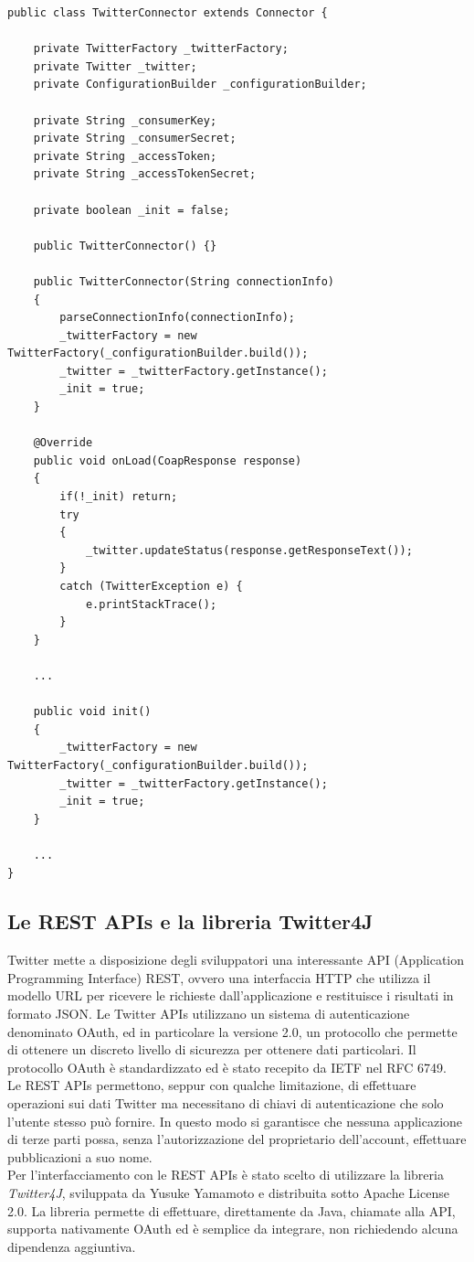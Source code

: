 \lstset{title=Parte della classe TwitterConnector}
\begin{lstlisting}[float]
public class TwitterConnector extends Connector {
	
	private TwitterFactory _twitterFactory;
	private Twitter _twitter;
	private ConfigurationBuilder _configurationBuilder;
	
	private String _consumerKey;
	private String _consumerSecret;
	private String _accessToken;
	private String _accessTokenSecret;
	
	private boolean _init = false;
	
	public TwitterConnector() {}
	
	public TwitterConnector(String connectionInfo)
	{
		parseConnectionInfo(connectionInfo);
		_twitterFactory = new TwitterFactory(_configurationBuilder.build());
		_twitter = _twitterFactory.getInstance();
		_init = true;
	}
	
	@Override
	public void onLoad(CoapResponse response)
	{
		if(!_init) return;
		try 
		{
			_twitter.updateStatus(response.getResponseText());
		} 
		catch (TwitterException e) {
			e.printStackTrace();
		}
	}

	...
	
	public void init()
	{
		_twitterFactory = new TwitterFactory(_configurationBuilder.build());
		_twitter = _twitterFactory.getInstance();
		_init = true;
	}
	
	...
}
\end{lstlisting}

\subsection{Le REST APIs e la libreria Twitter4J}
Twitter mette a disposizione degli sviluppatori una interessante API (Application Programming Interface) REST, ovvero una interfaccia HTTP che utilizza il modello URL per ricevere le richieste dall'applicazione e restituisce i risultati in formato JSON. Le Twitter APIs utilizzano un sistema di autenticazione denominato OAuth, ed in particolare la versione 2.0, un protocollo che permette di ottenere un discreto livello di sicurezza per ottenere dati particolari. Il protocollo OAuth è standardizzato ed è stato recepito da IETF nel RFC 6749.
\\Le REST APIs permettono, seppur con qualche limitazione, di effettuare operazioni sui dati Twitter ma necessitano di chiavi di autenticazione che solo l'utente stesso può fornire. In questo modo si garantisce che nessuna applicazione di terze parti possa, senza l'autorizzazione del proprietario dell'account, effettuare pubblicazioni a suo nome.
\\Per l'interfacciamento con le REST APIs è stato scelto di utilizzare la libreria \textit{Twitter4J}, sviluppata da Yusuke Yamamoto e distribuita sotto Apache License 2.0. La libreria permette di effettuare, direttamente da Java, chiamate alla API, supporta nativamente OAuth ed è semplice da integrare, non richiedendo alcuna dipendenza aggiuntiva.

